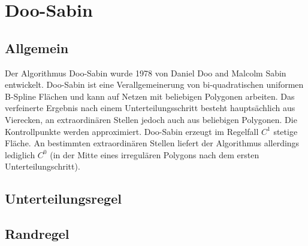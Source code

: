 \section{Doo-Sabin}

\subsection{Allgemein}

Der Algorithmus Doo-Sabin wurde 1978 von Daniel Doo and Malcolm Sabin entwickelt.
Doo-Sabin ist eine Verallgemeinerung von bi-quadratischen uniformen B-Spline Flächen
und kann auf Netzen mit beliebigen Polygonen arbeiten.
Das verfeinerte Ergebnis nach einem Unterteilungsschritt besteht hauptsächlich
aus Vierecken, an extraordinären Stellen jedoch auch aus beliebigen Polygonen.
Die Kontrollpunkte werden approximiert.
Doo-Sabin erzeugt im Regelfall \(C^1\) stetige Fläche.
An bestimmten extraordinären Stellen liefert der Algorithmus allerdings lediglich \(C^0\)
(in der Mitte eines irregulären Polygons nach dem ersten Unterteilungschritt).
\cite[S. 60]{Standford.24.07.2015} \cite[S. 79f]{Zorin.subdivcourse}

\subsection{Unterteilungsregel}



\subsection{Randregel}


